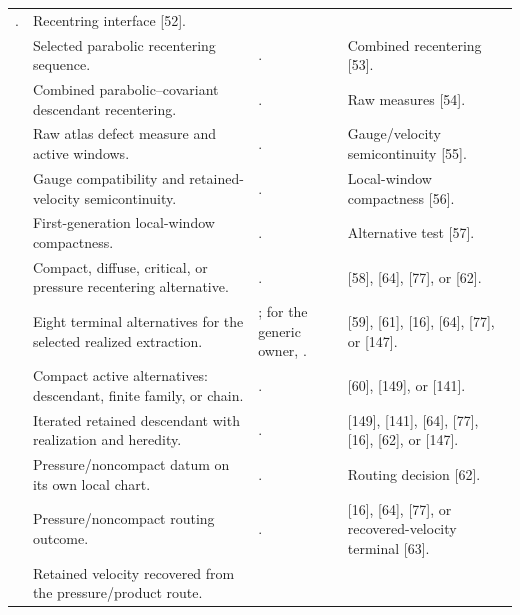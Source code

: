 \documentclass[11pt]{amsart}
\numberwithin{equation}{section}
\theoremstyle{plain}
\theoremstyle{definition}
\theoremstyle{remark}
\begin{document}
\begin{longtable}{@{}L{0.06\textwidth}L{0.25\textwidth}L{0.40\textwidth}L{0.21\textwidth}@{}}
. & Recentring interface [52].\\
\relax
[52] & Selected parabolic recentering sequence. &
. & Combined recentering [53].\\
\relax
[53] & Combined parabolic--covariant descendant recentering. &
. & Raw measures [54].\\
\relax
[54] & Raw atlas defect measure and active windows. &
. & Gauge/velocity semicontinuity [55].\\
\relax
[55] & Gauge compatibility and retained-velocity semicontinuity. &
. & Local-window compactness [56].\\
\relax
[56] & First-generation local-window compactness. &
. & Alternative test [57].\\
\relax
[57] & Compact, diffuse, critical, or pressure recentering alternative. &
. &
[58], [64], [77], or [62].\\
\relax
[58] & Eight terminal alternatives for the selected realized extraction. &
; for the generic owner,
. &
[59], [61], [16], [64], [77], or [147].\\
\relax
[59] & Compact active alternatives: descendant, finite family, or chain. &
. &
[60], [149], or [141].\\
\relax
[60] & Iterated retained descendant with realization and heredity. &
. &
[149], [141], [64], [77], [16], [62], or [147].\\
\relax
[61] & Pressure/noncompact datum on its own local chart. &
. &
Routing decision [62].\\
\relax
[62] & Pressure/noncompact routing outcome. &
. &
[16], [64], [77], or recovered-velocity terminal [63].\\
\relax
[63] & Retained velocity recovered from the pressure/product route. &

\end{longtable}
\end{document}
